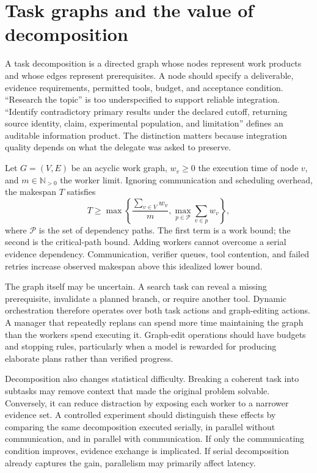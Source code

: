 \section{Task graphs and the value of decomposition}\label{sec:C21:decomposition}
A task decomposition is a directed graph whose nodes represent work products and whose edges represent prerequisites. A node should specify a deliverable, evidence requirements, permitted tools, budget, and acceptance condition. ``Research the topic'' is too underspecified to support reliable integration. ``Identify contradictory primary results under the declared cutoff, returning source identity, claim, experimental population, and limitation'' defines an auditable information product. The distinction matters because integration quality depends on what the delegate was asked to preserve.

Let $G=(V,E)$ be an acyclic work graph, $w_v\geq0$ the execution time of node $v$, and $m\in\mathbb N_{>0}$ the worker limit. Ignoring communication and scheduling overhead, the makespan $T$ satisfies
\begin{equation}
 T\geq\max\left\{\frac{\sum_{v\in V}w_v}{m},
 \max_{p\in\mathcal P}\sum_{v\in p}w_v\right\},
\end{equation}
where $\mathcal P$ is the set of dependency paths. The first term is a work bound; the second is the critical-path bound. Adding workers cannot overcome a serial evidence dependency. Communication, verifier queues, tool contention, and failed retries increase observed makespan above this idealized lower bound.

The graph itself may be uncertain. A search task can reveal a missing prerequisite, invalidate a planned branch, or require another tool. Dynamic orchestration therefore operates over both task actions and graph-editing actions. A manager that repeatedly replans can spend more time maintaining the graph than the workers spend executing it. Graph-edit operations should have budgets and stopping rules, particularly when a model is rewarded for producing elaborate plans rather than verified progress.

Decomposition also changes statistical difficulty. Breaking a coherent task into subtasks may remove context that made the original problem solvable. Conversely, it can reduce distraction by exposing each worker to a narrower evidence set. A controlled experiment should distinguish these effects by comparing the same decomposition executed serially, in parallel without communication, and in parallel with communication. If only the communicating condition improves, evidence exchange is implicated. If serial decomposition already captures the gain, parallelism may primarily affect latency.

